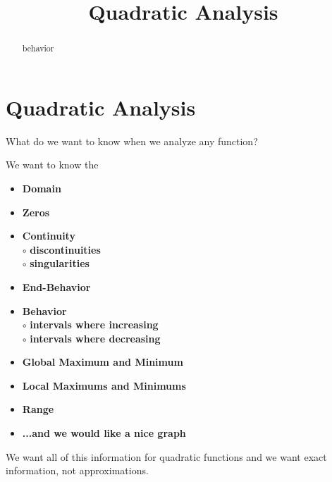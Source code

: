 \documentclass{ximera}
\title{Quadratic Analysis}
\begin{document}
\begin{abstract}
behavior
\end{abstract}
\maketitle




 
 



\section*{Quadratic Analysis}

What do we want to know when we analyze any function?

We want to know the 
\begin{itemize}
     \item \textbf{\textcolor{red!70!black}{Domain}} 
     \item \textbf{\textcolor{red!70!black}{Zeros}} 
     \item \textbf{\textcolor{red!70!black}{Continuity}} \\
     \text{    }$\circ$ \textbf{\textcolor{purple!85!blue}{discontinuities}}\\
     \text{    }$\circ$ \textbf{\textcolor{purple!85!blue}{singularities}}\\
     \item \textbf{\textcolor{red!70!black}{End-Behavior}} 
     \item \textbf{\textcolor{red!70!black}{Behavior}} \\
     \text{    }$\circ$ \textbf{\textcolor{purple!85!blue}{intervals where increasing}}\\
     \text{    }$\circ$ \textbf{\textcolor{purple!85!blue}{intervals where decreasing}}\\
     \item \textbf{\textcolor{red!70!black}{Global Maximum and Minimum}} 
     \item \textbf{\textcolor{red!70!black}{Local Maximums and Minimums}} 
     \item \textbf{\textcolor{red!70!black}{Range}} 
     \item \textbf{\textcolor{blue!55!black}{...and we would like a nice graph}} 
\end{itemize}

We want all of this information for quadratic functions and we want exact information, not approximations. 
\end{document}
